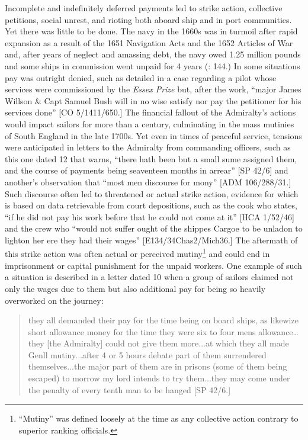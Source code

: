 Incomplete and indefinitely deferred payments led to strike action, collective petitions, social unrest, and rioting both aboard ship and in port communities. Yet there was little to be done. The navy in the 1660s was in turmoil after rapid expansion as a result of the 1651 Navigation Acts and the 1652 Articles of War and, after years of neglect and amassing debt, the navy owed 1.25 million pounds and some ships in commission went unpaid for 4 years (\citealt{Lincoln2015}: 144.) In some situations pay was outright denied, such as detailed in a case regarding a pilot whose services were commissioned by the \textit{Essex Prize} but, after the work, “major James Willson \& Capt Samuel Bush will in no wise satisfy nor pay the petitioner for his services done” [CO 5/1411/650.] The financial fallout of the Admiralty’s actions would impact sailors for more than a century, culminating in the mass mutinies of South England in the late 1700s. Yet even in times of peaceful service, tensions were anticipated in letters to the Admiralty from commanding officers, such as this one dated 12 \citealt{March1700} that warns, “there hath been but a small sume assigned them, and the course of payments being seaventeen months in arrear” [SP 42/6] and another’s observation that “most men discourse for mony” [ADM 106/288/31.] Such discourse often led to threatened or actual strike action, evidence for which is based on data retrievable from court depositions, such as the cook who states, “if he did not pay his work before that he could not come at it” [HCA 1/52/46] and the crew who “would not suffer ought of the shippes Cargoe to be unladon to lighton her ere they had their wages” [E134/34Chas2/Mich36.] The aftermath of this strike action was often actual or perceived mutiny\footnote{“Mutiny” was defined loosely at the time as any collective action contrary to superior ranking officials.} and could end in imprisonment or capital punishment for the unpaid workers. One example of such a situation is described in a letter dated 10 \citealt{December1700} when a group of sailors claimed not only the wages due to them but also additional pay for being so heavily overworked on the journey:

\begin{quotation}
they all demanded their pay for the time being on board ships, as likewize short allowance money for the time they were six to four mens allowance… they [the Admiralty] could not give them more...at which they all made Genll mutiny...after 4 or 5 hours debate part of them surrendered themselves...the major part of them are in prisons (some of them being escaped) to morrow my lord intends to try them...they may come under the penalty of every tenth man to be hanged [SP 42/6.]\end{quotation}

